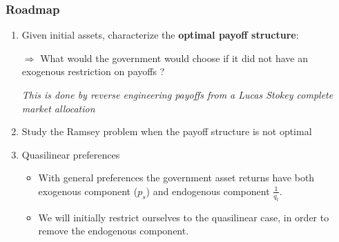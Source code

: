 \documentclass{beamer}
\begin{document}
 
\begin{frame}
\frametitle{Roadmap}
	\begin{enumerate}
	
		\item  Given initial assets, characterize the \textbf{optimal payoff structure}:
		
		$\Rightarrow$ What would the government would choose if it did not have an exogenous restriction on payoffs ?
		
 		 \emph{This is done by  reverse engineering payoffs from a Lucas Stokey complete market allocation}

			
		
		\item Study the Ramsey problem when the payoff structure is not optimal
		\item Quasilinear preferences
	\begin{itemize}		
		\item  With general preferences the government asset returns have both exogenous component ($p_s$) and endogenous component $\frac{1}{q_t}$.
		\item  We will initially restrict ourselves to the quasilinear case, in order to remove the endogenous component.
	\end{itemize}
\end{enumerate}
\end{frame}
  
\end{document}
